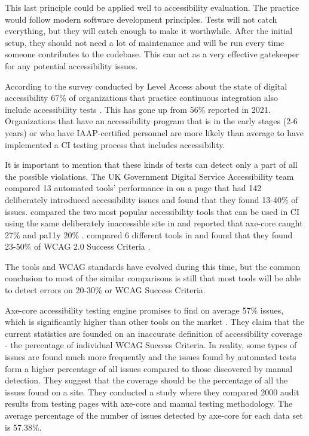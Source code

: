 \documentclass{master_thesis}
\begin{document}
This last principle could be applied well to accessibility evaluation. The practice would follow modern software development principles. Tests will not catch everything, but they will catch enough to make it worthwhile. After the initial setup, they should not need a lot of maintenance and will be run every time someone contributes to the codebase. This can act as a very effective gatekeeper for any potential accessibility issues.

According to the survey conducted by Level Access about the state of digital accessibility 67\% of organizations that practice continuous integration also include accessibility tests \citep{LevelAccess}. This has gone up from 56\% reported in 2021. Organizations that have an accessibility program that is in the early stages (2-6 years) or who have IAAP-certified personnel are more likely than average to have implemented a CI testing process that includes accessibility.

It is important to mention that these kinds of tests can detect only a part of all the possible violations. The UK Government Digital Service Accessibility team compared 13 automated tools' performance in \citeyear{GAT2018} on a page that had 142 deliberately introduced accessibility issues and found that they found 13-40\% of issues. \citeauthor{Abbott2021} compared the two most popular accessibility tools that can be used in CI using the same deliberately inaccessible site in \citeyear{Abbott2021} and reported that axe-core caught 27\% and pa11y 20\% \citep{Abbott2021}. \citeauthor{Vigo2013} compared 6 different tools in \citeyear{Vigo2013} and found that they found 23-50\% of  WCAG 2.0 Success Criteria \citep{GAT2018, Abbott2021, Vigo2013}.

The tools and WCAG standards have evolved during this time, but the common conclusion to most of the similar comparisons is still that most tools will be able to detect errors on 20-30\% or WCAG Success Criteria. 

Axe-core accessibility testing engine promises to find on average 57\% issues, which is significantly higher than other tools on the market \citep{Deque2023}. They claim that the current statistics are founded on an inaccurate definition of accessibility coverage - the percentage of individual WCAG Success Criteria. In reality, some types of issues are found much more frequently and the issues found by automated tests form a higher percentage of all issues compared to those discovered by manual detection. They suggest that the coverage should be the percentage of all the issues found on a site. They conducted a study where they compared 2000 audit results from testing pages with axe-core and manual testing methodology. The average percentage of the number of issues detected by axe-core for each data set is 57.38\%.
\end{document}
